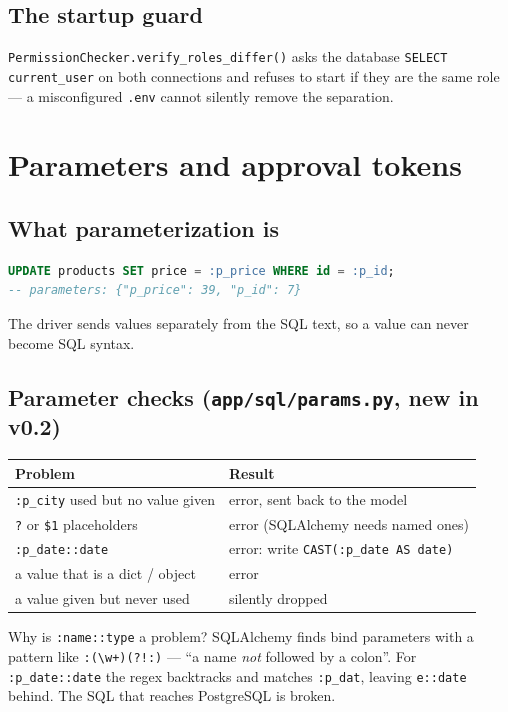 \documentclass[11pt,a4paper]{article}
\begin{document}
\subsection*{The startup guard}
\texttt{PermissionChecker.verify\_roles\_differ()} asks the database
\texttt{SELECT current\_user} on both connections and refuses to start if they
are the same role --- a misconfigured \texttt{.env} cannot silently remove
the separation.

\section{Parameters and approval tokens}

\subsection*{What parameterization is}
\begin{lstlisting}[language=SQL]
UPDATE products SET price = :p_price WHERE id = :p_id;
-- parameters: {"p_price": 39, "p_id": 7}
\end{lstlisting}
The driver sends values separately from the SQL text, so a value can never
become SQL syntax.

\subsection*{Parameter checks (\texttt{app/sql/params.py}, new in v0.2)}
\begin{center}
\begin{tabular}{@{}ll@{}}
\toprule
\textbf{Problem} & \textbf{Result} \\
\midrule
\texttt{:p\_city} used but no value given & error, sent back to the model \\
\texttt{?} or \texttt{\$1} placeholders   & error (SQLAlchemy needs named ones) \\
\texttt{:p\_date::date}                   & error: write \texttt{CAST(:p\_date AS date)} \\
a value that is a dict / object           & error \\
a value given but never used              & silently dropped \\
\bottomrule
\end{tabular}
\end{center}

Why is \texttt{:name::type} a problem? SQLAlchemy finds bind parameters with a
pattern like \texttt{:(\textbackslash w+)(?!:)} --- ``a name \emph{not}
followed by a colon''. For \texttt{:p\_date::date} the regex backtracks and
matches \texttt{:p\_dat}, leaving \texttt{e::date} behind. The SQL that
reaches PostgreSQL is broken.
\end{document}
